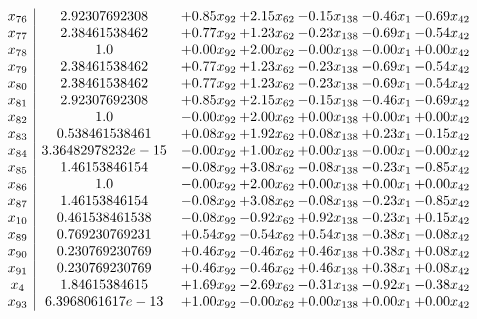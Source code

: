 \documentclass[8pt]{article}
\begin{document}
\[\begin{array}{c| c c@{\hskip 2pt} c@{\hskip 2pt} c@{\hskip 2pt} c@{\hskip 2pt} c@{\hskip 2pt} }
 x_{76}   &  2.92307692308 & +  0.85 x_{92} & +  2.15 x_{62} & -0.15 x_{138} & -0.46 x_{1} & -0.69 x_{42}\\
 x_{77}   &  2.38461538462 & +  0.77 x_{92} & +  1.23 x_{62} & -0.23 x_{138} & -0.69 x_{1} & -0.54 x_{42}\\
 x_{78}   &  1.0 & +  0.00 x_{92} & +  2.00 x_{62} & -0.00 x_{138} & -0.00 x_{1} & +  0.00 x_{42}\\
 x_{79}   &  2.38461538462 & +  0.77 x_{92} & +  1.23 x_{62} & -0.23 x_{138} & -0.69 x_{1} & -0.54 x_{42}\\
 x_{80}   &  2.38461538462 & +  0.77 x_{92} & +  1.23 x_{62} & -0.23 x_{138} & -0.69 x_{1} & -0.54 x_{42}\\
 x_{81}   &  2.92307692308 & +  0.85 x_{92} & +  2.15 x_{62} & -0.15 x_{138} & -0.46 x_{1} & -0.69 x_{42}\\
 x_{82}   &  1.0 & -0.00 x_{92} & +  2.00 x_{62} & +  0.00 x_{138} & +  0.00 x_{1} & +  0.00 x_{42}\\
 x_{83}   &  0.538461538461 & +  0.08 x_{92} & +  1.92 x_{62} & +  0.08 x_{138} & +  0.23 x_{1} & -0.15 x_{42}\\
 x_{84}   &  3.36482978232e-15 & -0.00 x_{92} & +  1.00 x_{62} & +  0.00 x_{138} & -0.00 x_{1} & -0.00 x_{42}\\
 x_{85}   &  1.46153846154 & -0.08 x_{92} & +  3.08 x_{62} & -0.08 x_{138} & -0.23 x_{1} & -0.85 x_{42}\\
 x_{86}   &  1.0 & -0.00 x_{92} & +  2.00 x_{62} & +  0.00 x_{138} & +  0.00 x_{1} & +  0.00 x_{42}\\
 x_{87}   &  1.46153846154 & -0.08 x_{92} & +  3.08 x_{62} & -0.08 x_{138} & -0.23 x_{1} & -0.85 x_{42}\\
 x_{10}   &  0.461538461538 & -0.08 x_{92} & -0.92 x_{62} & +  0.92 x_{138} & -0.23 x_{1} & +  0.15 x_{42}\\
 x_{89}   &  0.769230769231 & +  0.54 x_{92} & -0.54 x_{62} & +  0.54 x_{138} & -0.38 x_{1} & -0.08 x_{42}\\
 x_{90}   &  0.230769230769 & +  0.46 x_{92} & -0.46 x_{62} & +  0.46 x_{138} & +  0.38 x_{1} & +  0.08 x_{42}\\
 x_{91}   &  0.230769230769 & +  0.46 x_{92} & -0.46 x_{62} & +  0.46 x_{138} & +  0.38 x_{1} & +  0.08 x_{42}\\
 x_{4}   &  1.84615384615 & +  1.69 x_{92} & -2.69 x_{62} & -0.31 x_{138} & -0.92 x_{1} & -0.38 x_{42}\\
 x_{93}   &  6.3968061617e-13 & +  1.00 x_{92} & -0.00 x_{62} & +  0.00 x_{138} & +  0.00 x_{1} & +  0.00 x_{42}\\

\end{array}\]
\end{document}
